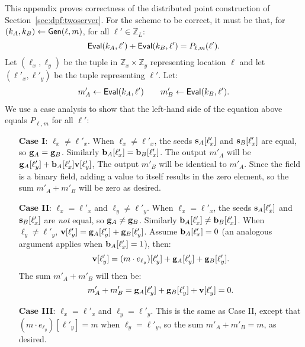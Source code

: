 \documentclass[10pt,twocolumn]{article}
\newcommand{\Z}{\mathbb{Z}}
\begin{document}
This appendix proves correctness of the distributed
point construction of Section~\ref{sec:dpf:twoserver}.
For the scheme to be correct,
it must be that, for
$(k_A, k_B) \gets {\sf Gen}(\ell, m)$, for all $\ell' \in \Z_L$:
\[{\sf Eval}(k_A, \ell') + {\sf Eval}(k_B, \ell') = P_{\ell, m}(\ell'). \]
Let $(\ell_x,\ell_y)$ be the tuple in $\Z_x \times \Z_y$ representing
location $\ell$ and let $(\ell'_x,\ell'_y)$ be the tuple representing $\ell'$.
Let:
\begin{align*}
m'_A \gets {\sf Eval}(k_A, \ell') \qquad m'_B \gets {\sf Eval}(k_B, \ell').
\end{align*}
We use a case analysis to show that the left-hand side of the 
equation above equals $P_{\ell,m}$ for all $\ell'$:
\begin{itemize}
\item[{\bf Case I}:] $\ell_x \neq \ell'_x$. 
  When $\ell_x \neq \ell'_x$, 
  the seeds ${\bf s}_A[\ell'_x]$ and ${\bf s}_B[\ell'_x]$
  are equal, so ${\bf g}_A = {\bf g}_B$.
  Similarly ${\bf b}_A[\ell'_x] = {\bf b}_B[\ell'_x]$.
  The output $m'_A$ will be
  ${\bf g}_A[\ell'_y] + {\bf b}_A[\ell'_x]{\bf v}[\ell'_y]$,
  The output $m'_B$ will be identical to $m'_A$.
  Since the field is a binary field, adding
  a value to itself results in the zero element,
  so the sum $m'_A + m'_B$ will be zero as desired.

\item[{\bf Case II}:] $\ell_x = \ell'_x$ and $\ell_y \neq \ell'_y$.
  When $\ell_x = \ell'_x$, the seeds ${\bf s}_A[\ell'_x]$ and ${\bf s}_B[\ell'_x]$
  are {\em not} equal, so ${\bf g}_A \neq {\bf g}_B$.
  Similarly ${\bf b}_A[\ell'_x] \neq {\bf b}_B[\ell'_x]$.
  When $\ell_y \neq \ell'_y$, 
  ${\bf v}[\ell'_y] = {\bf g}_A[\ell'_y] + {\bf g}_B[\ell'_y]$.
  Assume ${\bf b}_A[\ell'_x] = 0$ (an analogous argument applies when 
  ${\bf b}_A[\ell'_x] = 1$), then:
  \[  {\bf v}[\ell'_y] = (m \cdot e_{\ell_y})[\ell'_y] + {\bf g}_A[\ell'_y] + {\bf g}_B[\ell'_y]. \]
  The sum $m'_A + m'_B$ will then be:
  \[ m'_A + m'_B = {\bf g}_A[\ell'_y] + {\bf g}_B[\ell'_y] + {\bf v}[\ell'_y] = 0.\]

\item[{\bf Case III}:] $\ell_x = \ell'_x$ and $\ell_y = \ell'_y$.
  This is the same as Case II, except that $(m \cdot e_{\ell_y})[\ell'_y] = m$ when
  $\ell_y = \ell'_y$, so the sum $m'_A + m'_B = m$, as desired.

\end{itemize}

 
\end{document}
